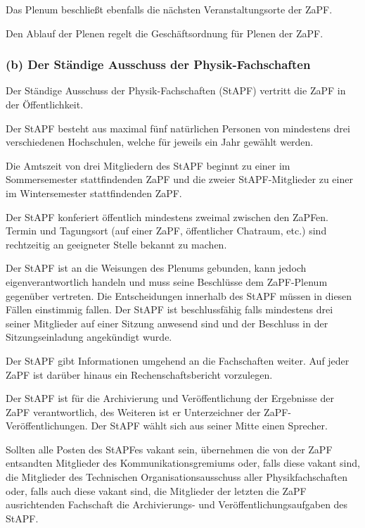 Das Plenum beschließt ebenfalls die nächsten Veranstaltungsorte der ZaPF.

Den Ablauf der Plenen regelt die Geschäftsordnung für Plenen der ZaPF.


\subsubsection*{(b) Der Ständige Ausschuss der Physik-Fachschaften%
  \label{b-der-standige-ausschuss-der-physik-fachschaften}%
}

Der Ständige Ausschuss der Physik-Fachschaften (StAPF) vertritt die ZaPF in der
Öffentlichkeit.

Der StAPF besteht aus maximal fünf natürlichen Personen von mindestens drei
verschiedenen Hochschulen, welche für jeweils ein Jahr gewählt werden.

Die Amtszeit von drei Mitgliedern des StAPF beginnt zu einer im Sommersemester
stattfindenden ZaPF und die zweier StAPF-Mitglieder zu einer im Wintersemester
stattfindenden ZaPF.

Der StAPF konferiert öffentlich mindestens zweimal zwischen den ZaPFen.
Termin und Tagungsort (auf einer ZaPF, öffentlicher Chatraum, etc.) sind
rechtzeitig an geeigneter Stelle bekannt zu machen.

Der StAPF ist an die Weisungen des Plenums gebunden, kann jedoch
eigenverantwortlich handeln und muss seine Beschlüsse dem ZaPF-Plenum gegenüber
vertreten.
Die Entscheidungen innerhalb des StAPF müssen in diesen Fällen einstimmig fallen.
Der StAPF ist beschlussfähig falls mindestens drei seiner Mitglieder auf einer
Sitzung anwesend sind und der Beschluss in der Sitzungseinladung angekündigt
wurde.

Der StAPF gibt Informationen umgehend an die Fachschaften weiter.
Auf jeder ZaPF ist darüber hinaus ein Rechenschaftsbericht vorzulegen.

Der StAPF ist für die Archivierung und Veröffentlichung der Ergebnisse der ZaPF
verantwortlich, des Weiteren ist er Unterzeichner der ZaPF-Veröffentlichungen.
Der StAPF wählt sich aus seiner Mitte einen Sprecher.

Sollten alle Posten des StAPFes vakant sein, übernehmen die von der ZaPF
entsandten Mitglieder des Kommunikationsgremiums oder, falls diese vakant sind,
die Mitglieder des Technischen Organisationsausschuss aller Physikfachschaften
oder, falls auch diese vakant sind, die Mitglieder der letzten die ZaPF
ausrichtenden Fachschaft die Archivierungs- und Veröffentlichungsaufgaben des
StAPF.


